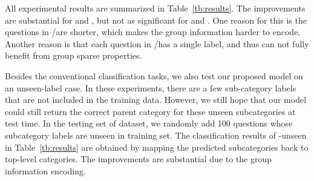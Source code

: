All experimental results are summarized in Table~\ref{tb:results}. 
The improvements are substantial for \Insurance and \DMV,
but not as significant for \Yahoo and \TREC.
One reason for this is the questions in \Yahoo/\TREC are shorter, %
which makes the group information harder to encode. 
Another reason is that each question in \Yahoo/\TREC has a single label, and thus can not fully benefit from group sparse properties.

Besides the conventional classification tasks, we also test our proposed model on an unseen-label case. In these experiments, there are a few sub-category labels that are not included in the training data. However, we still hope that our model could still return the correct parent category for these unseen subcategories at test time.
In the testing set of \Yahoo dataset, we randomly add 100 questions whose subcategory labels are unseen in training set. The classification results of \Yahoo-unseen in Table~\ref{tb:results} are obtained by mapping the predicted subcategories back to top-level categories. %
The improvements are substantial due to the group information encoding.


